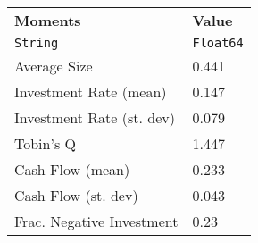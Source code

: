 \begin{tabular}{ll}
  \hline\hline
  \textbf{Moments} & \textbf{Value} \\
  \texttt{String} & \texttt{Float64} \\\hline
  Average Size & 0.441 \\
  Investment Rate (mean) & 0.147 \\
  Investment Rate (st. dev) & 0.079 \\
  Tobin’s Q & 1.447 \\
  Cash Flow (mean) & 0.233 \\
  Cash Flow (st. dev) & 0.043 \\
  Frac. Negative Investment & 0.23 \\\hline\hline
\end{tabular}

